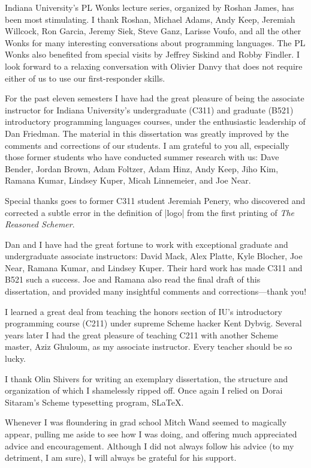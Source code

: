 Indiana University's PL Wonks lecture series, organized by Roshan
James, has been most stimulating.  I thank Roshan, Michael Adams, Andy
Keep, Jeremiah Willcock, Ron Garcia, Jeremy Siek, Steve Ganz, Larisse
Voufo, and all the other Wonks for many interesting conversations
about programming languages.  The PL Wonks also benefited from special
visits by Jeffrey Siskind and Robby Findler.  I look forward to a
relaxing conversation with Olivier Danvy that does not require either
of us to use our first-responder skills.

For the past eleven semesters I have had the great pleasure of being
the associate instructor for Indiana University's undergraduate (C311)
and graduate (B521) introductory programming languages courses, under
the enthusiastic leadership of Dan Friedman.  The material in this
dissertation was greatly improved by the comments and corrections of
our students.  I am grateful to you all, especially those former
students who have conducted summer research with us: Dave Bender,
Jordan Brown, Adam Foltzer, Adam Hinz, Andy Keep, Jiho Kim, Ramana
Kumar, Lindsey Kuper, Micah Linnemeier, and Joe Near.

Special thanks goes to former C311 student Jeremiah Penery, who
discovered and corrected a subtle error in the definition of
\scheme|logo| from the first printing of {\em The Reasoned Schemer}.

Dan and I have had the great fortune to work with exceptional graduate
and undergraduate associate instructors: David Mack, Alex Platte, Kyle
Blocher, Joe Near, Ramana Kumar, and Lindsey Kuper.  Their hard
work has made C311 and B521 such a success.  Joe and Ramana also read
the final draft of this dissertation, and provided many insightful
comments and corrections---thank you!

I learned a great deal from teaching the honors section of IU's
introductory programming course (C211) under supreme Scheme hacker
Kent Dybvig.  Several years later I had the great pleasure of teaching
C211 with another Scheme master, Aziz Ghuloum, as my associate
instructor.  Every teacher should be so lucky.

I thank Olin Shivers for writing an exemplary dissertation, the
structure and organization of which I shamelessly ripped off.  Once
again I relied on Dorai Sitaram's Scheme typesetting program, S\LaTeX.

Whenever I was floundering in grad school Mitch Wand seemed to
magically appear, pulling me aside to see how I was doing, and
offering much appreciated advice and encouragement.  Although I did
not always follow his advice (to my detriment, I am sure), I will
always be grateful for his support.

